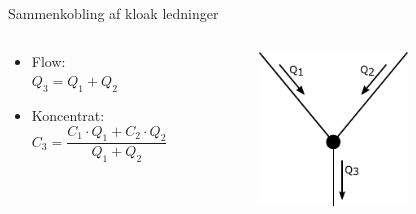 \begin{frame}{Sammenkobling af kloak ledninger}{}
\vfill\vfill\centering
	\begin{columns}
	\begin{column}{0.4\textwidth}
		\begin{itemize}
			\vspace{9mm}
			\item<1-> Flow: \\ $Q_3 = Q_1 + Q_2$
			\vspace{9mm}
			\item<2-> Koncentrat: \\ $C_3 = \dfrac{C_1 \cdot Q_1 + C_2 \cdot Q_2}{Q_1 + Q_2}$
		\end{itemize}
	\end{column}

	\begin{column}{0.48\textwidth}
		\begin{figure}[H]
			\centering
			\includegraphics[width=0.7\textwidth]{Sections/pictures/interconnections.pdf}
		\end{figure}
	\end{column}
\end{columns}
\vfill\vfill		
\end{frame}

